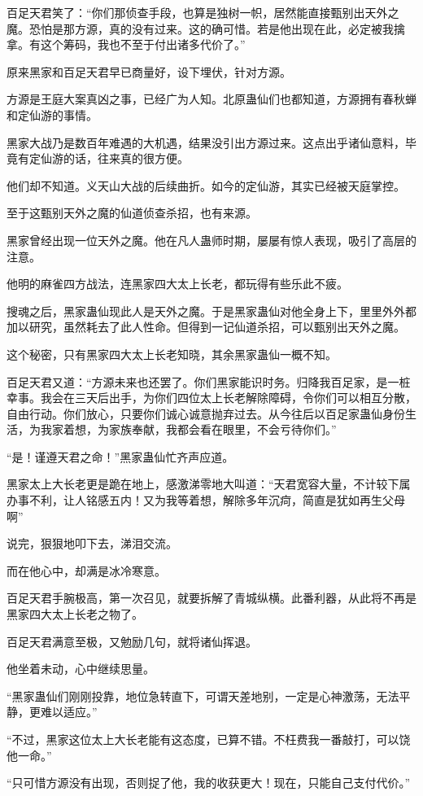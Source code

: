 \begin{this_body}
百足天君笑了：“你们那侦查手段，也算是独树一帜，居然能直接甄别出天外之魔。恐怕是那方源，真的没有过来。这的确可惜。若是他出现在此，必定被我擒拿。有这个筹码，我也不至于付出诸多代价了。”

原来黑家和百足天君早已商量好，设下埋伏，针对方源。

方源是王庭大案真凶之事，已经广为人知。北原蛊仙们也都知道，方源拥有春秋蝉和定仙游的事情。

黑家大战乃是数百年难遇的大机遇，结果没引出方源过来。这点出乎诸仙意料，毕竟有定仙游的话，往来真的很方便。

他们却不知道。义天山大战的后续曲折。如今的定仙游，其实已经被天庭掌控。

至于这甄别天外之魔的仙道侦查杀招，也有来源。

黑家曾经出现一位天外之魔。他在凡人蛊师时期，屡屡有惊人表现，吸引了高层的注意。

他明的麻雀四方战法，连黑家四大太上长老，都玩得有些乐此不疲。

搜魂之后，黑家蛊仙现此人是天外之魔。于是黑家蛊仙对他全身上下，里里外外都加以研究，虽然耗去了此人性命。但得到一记仙道杀招，可以甄别出天外之魔。

这个秘密，只有黑家四大太上长老知晓，其余黑家蛊仙一概不知。

百足天君又道：“方源未来也还罢了。你们黑家能识时务。归降我百足家，是一桩幸事。我会在三天后出手，为你们四位太上长老解除障碍，令你们可以相互分散，自由行动。你们放心，只要你们诚心诚意抛弃过去。从今往后以百足家蛊仙身份生活，为我家着想，为家族奉献，我都会看在眼里，不会亏待你们。”

“是！谨遵天君之命！”黑家蛊仙忙齐声应道。

黑家太上大长老更是跪在地上，感激涕零地大叫道：“天君宽容大量，不计较下属办事不利，让人铭感五内！又为我等着想，解除多年沉疴，简直是犹如再生父母啊”

说完，狠狠地叩下去，涕泪交流。

而在他心中，却满是冰冷寒意。

百足天君手腕极高，第一次召见，就要拆解了青城纵横。此番利器，从此将不再是黑家四大太上长老之物了。

百足天君满意至极，又勉励几句，就将诸仙挥退。

他坐着未动，心中继续思量。

“黑家蛊仙们刚刚投靠，地位急转直下，可谓天差地别，一定是心神激荡，无法平静，更难以适应。”

“不过，黑家这位太上大长老能有这态度，已算不错。不枉费我一番敲打，可以饶他一命。”

“只可惜方源没有出现，否则捉了他，我的收获更大！现在，只能自己支付代价。”


\end{this_body}
